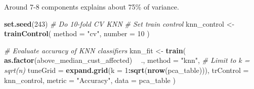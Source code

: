 \documentclass[
]{article}
\newenvironment{Shaded}{\begin{snugshade}}{\end{snugshade}}
\newcommand{\CommentTok}[1]{\textcolor[rgb]{0.56,0.35,0.01}{\textit{#1}}}
\newcommand{\DataTypeTok}[1]{\textcolor[rgb]{0.13,0.29,0.53}{#1}}
\newcommand{\DecValTok}[1]{\textcolor[rgb]{0.00,0.00,0.81}{#1}}
\newcommand{\KeywordTok}[1]{\textcolor[rgb]{0.13,0.29,0.53}{\textbf{#1}}}
\newcommand{\NormalTok}[1]{#1}
\newcommand{\OperatorTok}[1]{\textcolor[rgb]{0.81,0.36,0.00}{\textbf{#1}}}
\newcommand{\StringTok}[1]{\textcolor[rgb]{0.31,0.60,0.02}{#1}}
\begin{document}
Around 7-8 components explains about 75\% of variance.

\begin{Shaded}
\end{Shaded}

\begin{Shaded}
\begin{Highlighting}[]
\KeywordTok{set.seed}\NormalTok{(}\DecValTok{243}\NormalTok{)}
\CommentTok{# Do 10-fold CV KNN}
\CommentTok{# Set train control}
\NormalTok{knn_control <-}\StringTok{ }
\StringTok{  }\KeywordTok{trainControl}\NormalTok{(}
    \DataTypeTok{method =} \StringTok{"cv"}\NormalTok{, }
    \DataTypeTok{number =} \DecValTok{10}
\NormalTok{  )}

\CommentTok{# Evaluate accuracy of KNN classifiers}
\NormalTok{knn_fit <-}
\StringTok{  }\KeywordTok{train}\NormalTok{(}
    \KeywordTok{as.factor}\NormalTok{(above_median_cust_affected) }\OperatorTok{~}\StringTok{ }\NormalTok{.,}
    \DataTypeTok{method =} \StringTok{"knn"}\NormalTok{,}
    \CommentTok{# Limit to k = sqrt(n)}
    \DataTypeTok{tuneGrid =} \KeywordTok{expand.grid}\NormalTok{(}\DataTypeTok{k =} \DecValTok{1}\OperatorTok{:}\KeywordTok{sqrt}\NormalTok{(}\KeywordTok{nrow}\NormalTok{(pca_table))),}
    \DataTypeTok{trControl =}\NormalTok{ knn_control,}
    \DataTypeTok{metric =} \StringTok{"Accuracy"}\NormalTok{,}
    \DataTypeTok{data =}\NormalTok{ pca_table}
\NormalTok{  )}
\end{Highlighting}
\end{Shaded}

\begin{Shaded}
\end{Shaded}
\end{document}
